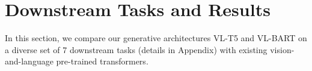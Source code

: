 \documentclass[twocolumn,3p,a4paper,preprint,11pt,margin=2.5cm]{elsarticle}
\begin{document}
\begin{table}[H]
\centering
{}
\caption{VQA Karpathy-test split accuracy using generative and
discriminative methods. We break down the questions into two
subsets in terms of whether the best-scoring answer $a^{*}$
for each question is included in the top-K answer candidates $A^{topk}$. In domain: $a^{*} \in A^{topk}$, Out-of-domain: $a^{*} \notin A^{topk} $ }
\label{tab:comparison}
\end{table}

\section{\Large{Downstream Tasks and Results}}
In this section, we compare our generative architectures VL-T5 and VL-BART on a diverse set of 7 downstream tasks
(details in Appendix) with existing vision-and-language pre-trained transformers.\\[0.4 cm]
\end{document}
